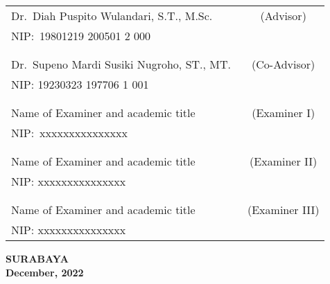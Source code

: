     \noindent
    \begin{tabularx}{\textwidth}{X c}
      Dr.\ Diah Puspito Wulandari, S.T., M.Sc.          & (Advisor) \\
      NIP:\ 19801219 200501 2 000       & \\
      &  \\
      &  \\
      Dr.\ Supeno Mardi Susiki Nugroho, ST., MT.\     & (Co-Advisor) \\
      NIP: 19230323 197706 1 001        & \\
      &  \\
      &  \\
      Name of Examiner and academic title  & (Examiner I) \\
      NIP:\ xxxxxxxxxxxxxxx       & \\
      &  \\
      &  \\
      Name of Examiner and academic title  & (Examiner II) \\
      NIP: xxxxxxxxxxxxxxx        & \\
      &  \\
      &  \\
      Name of Examiner and academic title            & (Examiner III) \\
      NIP: xxxxxxxxxxxxxxx        & \\
    \end{tabularx}
  \endgroup

  \vspace{4ex}

  \begin{center}
    \textbf{SURABAYA} \\
    \textbf{December, 2022}
  \end{center}
\endgroup
